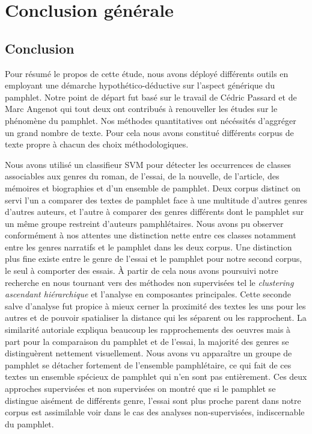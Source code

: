 \chapter{Conclusion générale}

\section{Conclusion}

Pour résumé le propos de cette étude, nous avons déployé différents outils en employant une démarche hypothético-déductive sur l'aspect générique du pamphlet. Notre point de départ fut basé sur le travail de Cédric Passard et de Marc Angenot qui tout deux ont contribués à renouveller les études sur le phénomène du pamphlet. Nos méthodes quantitatives ont nécéssités d'aggréger un grand nombre de texte. Pour cela nous avons constitué différents corpus de texte propre à chacun des choix méthodologiques. 

Nous avons utilisé un classifieur SVM pour détecter les occurrences de classes associables aux genres du roman, de l'essai, de la nouvelle, de l'article, des mémoires et biographies et d'un ensemble de pamphlet. Deux corpus distinct on servi l'un a comparer des textes de pamphlet face à une multitude d'autres genres d'autres auteurs, et l'autre à comparer des genres différents dont le pamphlet sur un même groupe restreint d'auteurs pamphlétaires.
Nous avons pu observer conformément à nos attentes une distinction nette entre ces classes notamment entre les genres narratifs et le pamphlet dans les deux corpus. Une distinction plus fine existe entre le genre de l'essai et le pamphlet pour notre second corpus, le seul à comporter des essais.
À partir de cela nous avons poursuivi notre recherche en nous tournant vers des méthodes non supervisées tel le \textit{clustering ascendant hiérarchique} et l'analyse en composantes principales. Cette seconde salve d'analyse fut propice à mieux cerner la proximité des textes les uns pour les autres et de pouvoir spatialiser la distance qui les séparent ou les rapprochent. La similarité autoriale expliqua beaucoup les rapprochements des oeuvres mais à part pour la comparaison du pamphlet et de l'essai, la majorité des genres se distinguèrent nettement visuellement. Nous avons vu apparaître un groupe de pamphlet se détacher fortement de l'ensemble pamphlétaire, ce qui fait de ces textes un ensemble spécieux de pamphlet qui n'en sont pas entièrement.
Ces deux approches supervisées et non supervisées on montré que si le pamphlet se distingue aisément de différents genre, l'essai sont plus proche parent dans notre corpus est assimilable voir dans le cas des analyses non-supervisées, indiscernable du pamphlet.

